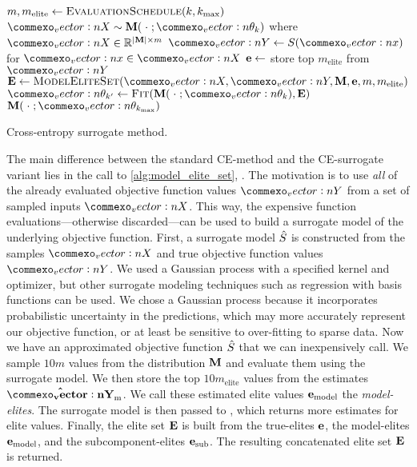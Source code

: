 \vspace{5mm} %

\begin{algorithm}[ht]
  \begin{algorithmic}
        \State $m, m_\text{elite} \leftarrow \textproc{EvaluationSchedule}(k, k_\text{max})$ 
        \State $\mat{X} \sim \M(\;\cdot\;; \vec{\theta}_k)$ where $\mat{X} \in \R^{|\M| \times m}$ 
        \State $\mat{Y} \leftarrow S(\vec{x})$ for $\vec{x} \in \mat{X}$ 
        \State $\mathbf{e} \leftarrow$ store top $m_\text{elite}$ from $\mat{Y}$ 
        \State $\bfE \leftarrow \textproc{ModelEliteSet}(\mat{X}, \mat{Y}, \M, \e, m, m_\text{elite})$ 
        \State $\vec{\theta}_{k^\prime} \leftarrow \textproc{Fit}(\M(\;\cdot\;; \vec{\theta}_k), \bfE)$ 
    \EndFor
    \State \Return $\M(\;\cdot\;; \vec{\theta}_{k_\text{max}})$
  \EndFunction
  \end{algorithmic}
  \caption{\label{alg:ce_surrogate} Cross-entropy surrogate method.}
\end{algorithm}

\newpage %

The main difference between the standard CE-method and the CE-surrogate variant lies in the call to \cref{alg:model_elite_set}, .
The motivation is to use \textit{all} of the already evaluated objective function values $\mat{Y}$ from a set of sampled inputs $\mat{X}$.
This way, the expensive function evaluations---otherwise discarded---can be used to build a surrogate model of the underlying objective function.
First, a surrogate model $\hat{S}$ is constructed from the samples $\mat{X}$ and true objective function values $\mat{Y}$.
We used a Gaussian process with a specified kernel and optimizer, but other surrogate modeling techniques such as regression with basis functions can be used.
We chose a Gaussian process because it incorporates probabilistic uncertainty in the predictions, which may more accurately represent our objective function, or at least be sensitive to over-fitting to sparse data.
Now we have an approximated objective function $\hat{S}$ that we can inexpensively call. 
We sample $10m$ values from the distribution $\mathbf{M}$ and evaluate them using the surrogate model.
We then store the top $10m_\text{elite}$ values from the estimates $\mathbf{\hat{\mat{Y}}}_\text{m}$.
We call these estimated elite values $\mathbf{e}_\text{model}$ the \textit{model-elites}.
The surrogate model is then passed to , which returns more estimates for elite values.
Finally, the elite set $\mathbf{E}$ is built from the true-elites $\mathbf{e}$, the model-elites $\mathbf{e}_\text{model}$, and the subcomponent-elites $\mathbf{e}_\text{sub}$.
The resulting concatenated elite set $\mathbf{E}$ is returned.

